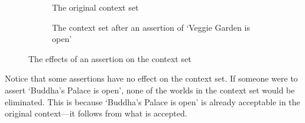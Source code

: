 \begin{figure}
\centering
\begin{subfigure}{\textwidth}
\centering
{}
\caption{The original context set}
\label{fig-original-context}
\end{subfigure}

\begin{subfigure}{\textwidth}
\centering
{}
\caption{The context set after an assertion of `Veggie Garden is open'}
\label{fig-assertion}
\end{subfigure}

\caption{The effects of an assertion on the context set}
\label{fig-context-set}
\end{figure}

Notice that some assertions have no effect on the context set.  If someone were to assert `Buddha's Palace is open', none of the worlds in the context set would be eliminated.  This is because `Buddha's Palace is open' is already acceptable in the original context---it follows from what is accepted.

